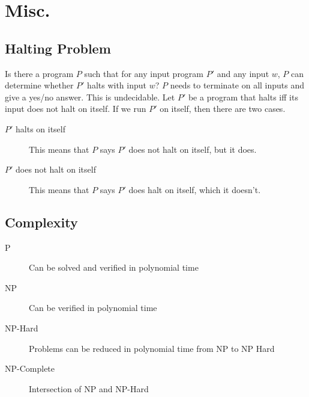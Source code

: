 \documentclass[a4paper]{article}
\begin{document}
\section{Misc.}
\subsection{Halting Problem}
Is there a program $P$ such that for any input program $P'$ and any input $w$, $P$ can determine whether $P'$ halts with input $w$? $P$ needs to terminate on all inputs and give a yes/no answer. This is undecidable. Let $P'$ be a program that halts iff its input does not halt on itself. If we run $P'$ on itself, then there are two cases.
\begin{description}
    \item[$P'$ halts on itself] This means that $P$ says $P'$ does not halt on itself, but it does.
    \item[$P'$ does not halt on itself] This means that $P$ says $P'$ does halt on itself, which it doesn't.
\end{description}

\subsection{Complexity}
\begin{description}
    \item[P] Can be solved and verified in polynomial time
    \item[NP] Can be verified in polynomial time
    \item[NP-Hard] Problems can be reduced in polynomial time from NP to NP Hard
    \item[NP-Complete] Intersection of NP and NP-Hard
\end{description}
\end{document}

